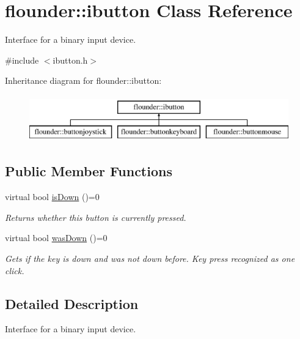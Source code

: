 \hypertarget{classflounder_1_1ibutton}{}\section{flounder\+:\+:ibutton Class Reference}
\label{classflounder_1_1ibutton}


Interface for a binary input device.  




{\ttfamily \#include $<$ibutton.\+h$>$}

Inheritance diagram for flounder\+:\+:ibutton\+:\begin{figure}[H]
\begin{center}
\leavevmode
\includegraphics[height=2.000000cm]{classflounder_1_1ibutton}
\end{center}
\end{figure}
\subsection*{Public Member Functions}
\begin{DoxyCompactItemize}
\item 
virtual bool \hyperlink{classflounder_1_1ibutton_ab64fd22a75ea66ce67fd9b1ad34fd837}{is\+Down} ()=0
\begin{DoxyCompactList}\small\item\em Returns whether this button is currently pressed. \end{DoxyCompactList}\item 
virtual bool \hyperlink{classflounder_1_1ibutton_a5fb7b3493c0ea0e67bb9defc272da0d3}{was\+Down} ()=0
\begin{DoxyCompactList}\small\item\em Gets if the key is down and was not down before. Key press recognized as one click. \end{DoxyCompactList}\end{DoxyCompactItemize}


\subsection{Detailed Description}
Interface for a binary input device. 



